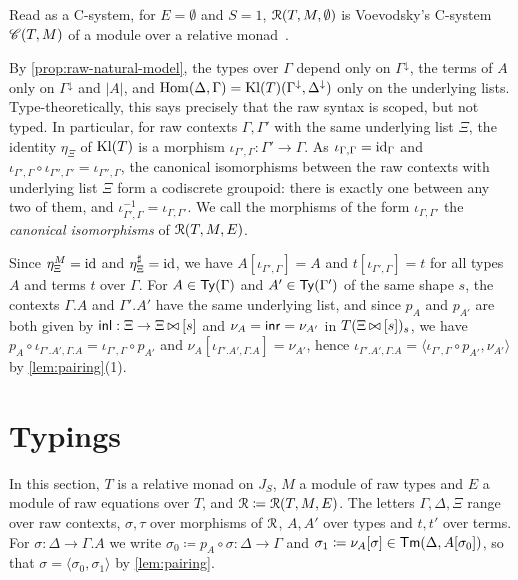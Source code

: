 \begin{remark}
    Read as a C-system, for $E = \emptyset$ and $S = 1$, $\mathcal{R}(T, M, \emptyset)$ is Voevodsky's C-system $\mathscr{C}(T, M)$ of a module over a relative monad~\cite[\S6]{Voevodsky2016Relative}.
\end{remark}

\begin{remark}\label{cor:sort-degeneracy}
    By \cref{prop:raw-natural-model}, the types over $\Gamma$ depend only on $\Gamma^{\downarrow}$, the terms of $A$ only on $\Gamma^{\downarrow}$ and $|A|$, and $\operatorname{Hom}(\Delta, \Gamma) = \mathrm{Kl}(T)(\Gamma^{\downarrow}, \Delta^{\downarrow})$ only on the underlying lists. Type-theoretically, this says precisely that the raw syntax is scoped, but not typed. In particular, for raw contexts $\Gamma, \Gamma'$ with the same underlying list $\Xi$, the identity $\eta_\Xi$ of $\mathrm{Kl}(T)$ is a morphism $\iota_{\Gamma', \Gamma} : \Gamma' \to \Gamma$. As $\iota_{\Gamma, \Gamma} = \mathrm{id}_\Gamma$ and $\iota_{\Gamma', \Gamma} \circ \iota_{\Gamma'', \Gamma'} = \iota_{\Gamma'', \Gamma}$, the canonical isomorphisms between the raw contexts with underlying list $\Xi$ form a codiscrete groupoid: there is exactly one between any two of them, and $\iota_{\Gamma', \Gamma}^{-1} = \iota_{\Gamma, \Gamma'}$. We call the morphisms of the form $\iota_{\Gamma,\Gamma'}$ the \emph{canonical isomorphisms} of $\mathcal{R}(T,M,E)$.

    Since $\eta_\Xi^M = \mathrm{id}$ and $\eta_\Xi^\sharp = \mathrm{id}$, we have $A[\iota_{\Gamma', \Gamma}] = A$ and $t[\iota_{\Gamma', \Gamma}] = t$ for all types $A$ and terms $t$ over $\Gamma$. For $A \in \mathsf{Ty}(\Gamma)$ and $A' \in \mathsf{Ty}(\Gamma')$ of the same shape $s$, the contexts $\Gamma.A$ and $\Gamma'.A'$ have the same underlying list, and since $p_A$ and $p_{A'}$ are both given by $\mathsf{inl} : \Xi \to \Xi \mathbin{\bowtie} [s]$ and $\nu_A = \mathsf{inr} = \nu_{A'}$ in $T(\Xi \mathbin{\bowtie} [s])_s$, we have $p_A \circ \iota_{\Gamma'.A', \Gamma.A} = \iota_{\Gamma', \Gamma} \circ p_{A'}$ and $\nu_A[\iota_{\Gamma'.A', \Gamma.A}] = \nu_{A'}$, hence $\iota_{\Gamma'.A', \Gamma.A} = \langle \iota_{\Gamma', \Gamma} \circ p_{A'}, \nu_{A'} \rangle$ by \cref{lem:pairing}(1).
\end{remark}

\section{Typings}
\label{sec:typings}

In this section, $T$ is a relative monad on $J_S$, $M$ a module of raw types and $E$ a module of raw equations over $T$, and $\mathcal{R} \coloneqq \mathcal{R}(T, M, E)$. The letters $\Gamma, \Delta, \Xi$ range over raw contexts, $\sigma, \tau$ over morphisms of $\mathcal{R}$, $A, A'$ over types and $t, t'$ over terms. For $\sigma : \Delta \to \Gamma.A$ we write $\sigma_0 \coloneqq p_A \circ \sigma : \Delta \to \Gamma$ and $\sigma_1 \coloneqq \nu_A[\sigma] \in \mathsf{Tm}(\Delta, A[\sigma_0])$, so that $\sigma = \langle \sigma_0, \sigma_1 \rangle$ by \cref{lem:pairing}.

